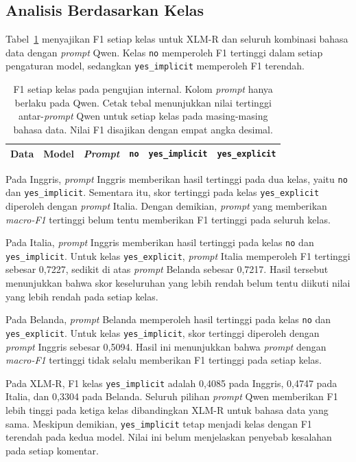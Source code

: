 \documentclass[11pt]{article}
\begin{document}
\subsection{Analisis Berdasarkan Kelas}
Tabel~\ref{tab:classes} menyajikan F1 setiap kelas untuk XLM-R dan seluruh kombinasi bahasa data dengan \textit{prompt} Qwen. Kelas \texttt{no} memperoleh F1 tertinggi dalam setiap pengaturan model, sedangkan \texttt{yes\_implicit} memperoleh F1 terendah.

\begin{table}[t]
\centering
\begin{tabular}{lllrrr}
\toprule
Data & Model & \textit{Prompt} & \texttt{no} & \texttt{yes\_implicit} & \texttt{yes\_explicit} \\
\midrule

\end{tabular}
\caption{F1 setiap kelas pada pengujian internal. Kolom \textit{prompt} hanya berlaku pada Qwen. Cetak tebal menunjukkan nilai tertinggi antar-\textit{prompt} Qwen untuk setiap kelas pada masing-masing bahasa data. Nilai F1 disajikan dengan empat angka desimal.}
\label{tab:classes}
\end{table}

Pada Inggris, \textit{prompt} Inggris memberikan hasil tertinggi pada dua kelas, yaitu \texttt{no} dan \nolinkurl{yes_implicit}. Sementara itu, skor tertinggi pada kelas \nolinkurl{yes_explicit} diperoleh dengan \textit{prompt} Italia. Dengan demikian, \textit{prompt} yang memberikan \textit{macro-F1} tertinggi belum tentu memberikan F1 tertinggi pada seluruh kelas.

Pada Italia, \textit{prompt} Inggris memberikan hasil tertinggi pada kelas \texttt{no} dan \nolinkurl{yes_implicit}. Untuk kelas \nolinkurl{yes_explicit}, \textit{prompt} Italia memperoleh F1 tertinggi sebesar 0,7227, sedikit di atas \textit{prompt} Belanda sebesar 0,7217. Hasil tersebut menunjukkan bahwa skor keseluruhan yang lebih rendah belum tentu diikuti nilai yang lebih rendah pada setiap kelas.

Pada Belanda, \textit{prompt} Belanda memperoleh hasil tertinggi pada kelas \texttt{no} dan \texttt{yes\_explicit}. Untuk kelas \texttt{yes\_implicit}, skor tertinggi diperoleh dengan \textit{prompt} Inggris sebesar 0,5094. Hasil ini menunjukkan bahwa \textit{prompt} dengan \textit{macro-F1} tertinggi tidak selalu memberikan F1 tertinggi pada setiap kelas.

Pada XLM-R, F1 kelas \texttt{yes\_implicit} adalah 0,4085 pada Inggris, 0,4747 pada Italia, dan 0,3304 pada Belanda. Seluruh pilihan \textit{prompt} Qwen memberikan F1 lebih tinggi pada ketiga kelas dibandingkan XLM-R untuk bahasa data yang sama. Meskipun demikian, \texttt{yes\_implicit} tetap menjadi kelas dengan F1 terendah pada kedua model. Nilai ini belum menjelaskan penyebab kesalahan pada setiap komentar.
\end{document}
